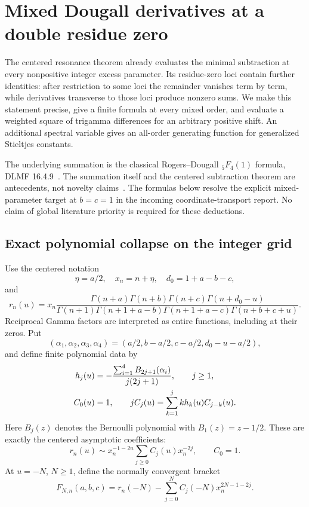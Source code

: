 \documentclass[11pt,a4paper]{article}
\numberwithin{equation}{section}
\theoremstyle{definition}
\theoremstyle{remark}
\begin{document}
\section{Mixed Dougall derivatives at a double residue zero}
\label{dg:section}

The centered resonance theorem already evaluates the minimal
subtraction at every nonpositive integer excess parameter. Its
residue-zero loci contain further identities: after restriction to
some loci the remainder vanishes term by term, while derivatives
transverse to those loci produce nonzero sums. We make this statement
precise, give a finite formula at every mixed order, and evaluate a
weighted square of trigamma differences for an arbitrary positive
shift. An additional spectral variable gives an all-order generating
function for generalized Stieltjes constants.

The underlying summation is the classical Rogers--Dougall
${}_5F_4(1)$ formula, DLMF 16.4.9~\cite{DLMFDougall}. The summation itself and the
centered subtraction theorem are antecedents, not novelty claims~\cite{RepoDougall,RepoTransport}.
The formulas below resolve the explicit mixed-parameter target
at $b=c=1$ in the incoming coordinate-transport report. No claim of
global literature priority is required for these deductions.

\subsection{Exact polynomial collapse on the integer grid}

Use the centered notation
\[
 \eta=a/2,\quad x_n=n+\eta,\quad d_0=1+a-b-c,
\]
and
\[
 r_n(u)=x_n\frac{\Gamma(n+a)\Gamma(n+b)\Gamma(n+c)
                     \Gamma(n+d_0-u)}
 {\Gamma(n+1)\Gamma(n+1+a-b)\Gamma(n+1+a-c)
                     \Gamma(n+b+c+u)}.
\]
Reciprocal Gamma factors are interpreted as entire functions, including
at their zeros. Put
\[
 (\alpha_1,\alpha_2,\alpha_3,\alpha_4)
       =(a/2,b-a/2,c-a/2,d_0-u-a/2),
\]
and define finite polynomial data by
\begin{align}
 h_j(u)&=-\frac{\sum_{i=1}^4B_{2j+1}(\alpha_i)}{j(2j+1)},\qquad j\geq1,
       \notag\\
 C_0(u)&=1,\qquad
 jC_j(u)=\sum_{k=1}^jkh_k(u)C_{j-k}(u).
 \label{dg:centered-recurrence}
\end{align}
Here $B_j(z)$ denotes the Bernoulli polynomial with $B_1(z)=z-1/2$.
These are exactly the centered asymptotic coefficients:
\[
 r_n(u)\sim x_n^{-1-2u}\sum_{j\geq0}C_j(u)x_n^{-2j},\qquad C_0=1.
\]
At $u=-N$, $N\geq1$, define the normally convergent bracket
\[
 F_{N,n}(a,b,c)=r_n(-N)-\sum_{j=0}^N C_j(-N)x_n^{2N-1-2j}.
\]
\end{document}
